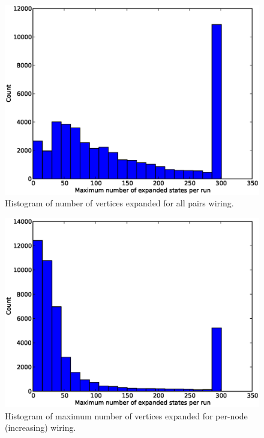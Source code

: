 \begin{figure}[H]
\begin{center}
\includegraphics[width=\textwidth]{Images/max_expanded_all_pairs.eps}
\caption{Histogram of number of vertices expanded for all pairs wiring.}
\label{fig:max_expanded_all_pairs}
\end{center}
\end{figure}

\begin{figure}[H]
\begin{center}
\includegraphics[width=\textwidth]{Images/max_expanded_per_node_increasing.eps}
\caption{Histogram of maximum number of vertices expanded for per-node
(increasing) wiring.}
\label{fig:max_expanded_per_node_increasing}
\end{center}
\end{figure}

